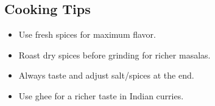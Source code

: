 \documentclass[12pt]{article}
\begin{document}
\begin{multicols}{2}
\section*{Cooking Tips}
\begin{itemize}
    \item Use fresh spices for maximum flavor.
    \item Roast dry spices before grinding for richer masalas.
    \item Always taste and adjust salt/spices at the end.
    \item Use ghee for a richer taste in Indian curries.
\end{itemize}
\end{multicols}
\end{document}
